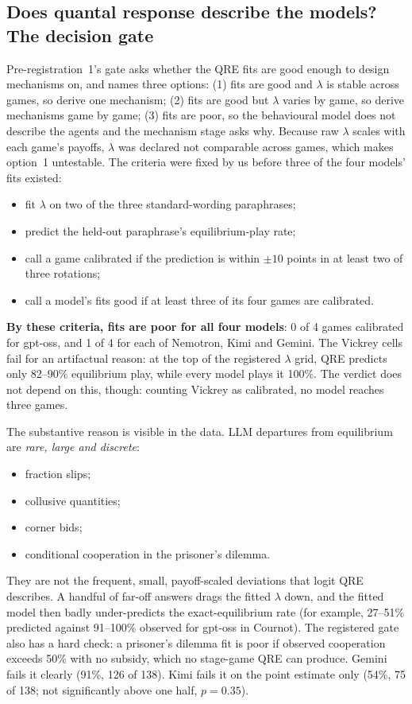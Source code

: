 \documentclass[10pt]{article}
\theoremstyle{definition}
\theoremstyle{remark}
\newcommand{\lam}{\lambda}
\begin{document}
\subsection{Does quantal response describe the models? The decision gate}

Pre-registration~1's gate asks whether the QRE fits are good enough to design mechanisms on, and
names three options: (1) fits are good and $\lam$ is stable across games, so derive one
mechanism; (2) fits are good but $\lam$ varies by game, so derive mechanisms game by game; (3)
fits are poor, so the behavioural model does not describe the agents and the mechanism stage
asks why. Because raw $\lam$ scales with each game's payoffs, $\lam$ was declared not comparable
across games, which makes option~1 untestable. The criteria were fixed by us before
three of the four models' fits existed:
\begin{itemize}
\item fit $\lam$ on two of the three standard-wording paraphrases;
\item predict the held-out paraphrase's equilibrium-play rate;
\item call a game calibrated if the prediction is within $\pm10$ points in at least two of three
  rotations;
\item call a model's fits good if at least three of its four games are calibrated.
\end{itemize}
\textbf{By these criteria, fits are poor for all four models}: 0 of 4 games calibrated for
gpt-oss, and 1 of 4 for each of Nemotron, Kimi and Gemini. The Vickrey cells fail for an artifactual reason: at the top of the registered
$\lam$ grid, QRE predicts only 82--90\% equilibrium play, while every model plays it 100\%. The
verdict does not depend on this, though: counting Vickrey as calibrated, no model reaches three
games.

The substantive reason is visible in the data. LLM departures from equilibrium are \emph{rare,
large and discrete}:
\begin{itemize}
\item fraction slips;
\item collusive quantities;
\item corner bids;
\item conditional cooperation in the prisoner's dilemma.
\end{itemize}
They are not the frequent, small, payoff-scaled deviations that logit QRE describes. A handful
of far-off answers drags the fitted $\lam$ down, and the fitted model then badly under-predicts
the exact-equilibrium rate (for example, 27--51\% predicted against 91--100\% observed for
gpt-oss in Cournot). The registered gate also has a hard check: a
prisoner's dilemma fit is poor if observed cooperation exceeds 50\% with no subsidy, which no
stage-game QRE can produce. Gemini fails it clearly (91\%, 126 of 138). Kimi fails it on the
point estimate only (54\%, 75 of 138; not significantly above one half, $p=0.35$).
\end{document}
